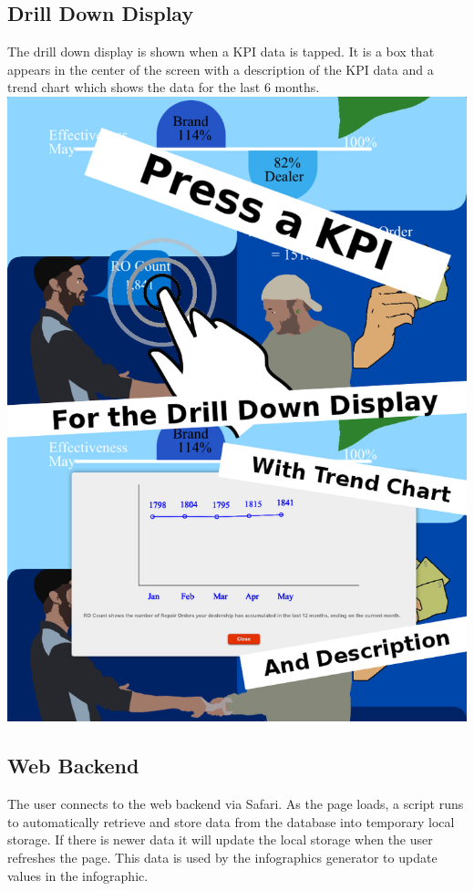 \documentclass[11pt,a4paper,oneside]{article}
\begin{document}
\newpage
\subsection{Drill Down Display}
The drill down display is shown when a KPI data is tapped.  It is a box that appears in the center of the screen with a description of the KPI data and a trend chart which shows the data for the last 6 months.\\

\includegraphics[width=1\textwidth]{images/fun.png}\\
\newpage
\subsection {Web Backend}

The user connects to the web backend via Safari. As the page loads, a script runs to automatically retrieve and store data from the database into temporary local storage. If there is newer data it will update the local storage when the user refreshes the page. This data is used by the infographics generator to update values in the infographic.\\
\end{document}
